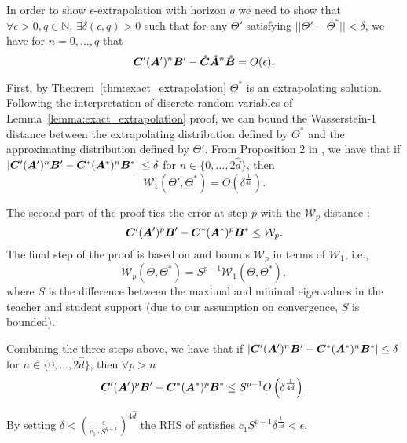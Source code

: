\begin{sproof}
In order to show $\epsilon$-extrapolation with horizon $q$ we need to show that $\forall\epsilon>0, q\in\mathbb{N}$, $\exists \delta(\epsilon,q)>0$ such that for any $\Theta'$ satisfying $||\Theta'-\Theta^*||<\delta$, we have for $n=0,\dots,q$ that
\begin{equation}
    {\bm{C}}'({\bm{A}}')^n{\bm{B}}'-\hat{{\bm{C}}}\hat{{\bm{A}}}^n\hat{{\bm{B}}}=O(\epsilon).
\end{equation}

First, by Theorem~\ref{thm:exact_extrapolation} $\Theta^*$ is an extrapolating solution. Following the interpretation of discrete random variables of Lemma~\ref{lemma:exact_extrapolation} proof, we can bound the Wasserstein-1 distance between the extrapolating distribution defined by $\Theta^*$ and the approximating distribution defined by $\Theta'$. From Proposition 2 in \cite{wu2020optimal}, we have that if $|{\bm{C}}'({\bm{A}}')^n{\bm{B}}'-{\bm{C}}^*({\bm{A}}^*)^n{\bm{B}}^*|\le \delta$ for $n\in\lbrace 0,\dots,2\hat{d}\rbrace$, then
\begin{equation}
    \mathcal{W}_1(\Theta',\Theta^*)=O\left(\delta^{\frac{1}{4\hat{d}}}\right).
\end{equation}

The second part of the proof ties the error at step $p$ with the $\mathcal{W}_p$ distance \citep{biswas2021bounding}:
\begin{equation}
    {\bm{C}}'({\bm{A}}')^p{\bm{B}}'-{\bm{C}}^*({\bm{A}}^*)^p{\bm{B}}^*\le \mathcal{W}_p.
\end{equation}
The final step of the proof is based on \cite{panaretos2019statistical} and bounds $\mathcal{W}_p$ in terms of $\mathcal{W}_1$, i.e.,
\begin{equation}
    \mathcal{W}_p(\Theta,\Theta^*)= S^{p-1}\mathcal{W}_1(\Theta,\Theta^*),
\end{equation}
where $S$ is the difference between the maximal and minimal eigenvalues in the teacher and student support (due to our assumption on convergence, $S$ is bounded).


Combining the three steps above, we have that if $|{\bm{C}}'({\bm{A}}')^n{\bm{B}}'-{\bm{C}}^*({\bm{A}}^*)^n{\bm{B}}^*|\le \delta$ for $n\in\lbrace 0,\dots,2\hat{d}\rbrace$, then $\forall p>n$ \begin{equation}\label{eq:final_inequality}
    {\bm{C}}'({\bm{A}}')^p{\bm{B}}'-{\bm{C}}^*({\bm{A}}^*)^p{\bm{B}}^*\le S^{p-1}O\left(\delta^{\frac{1}{4\hat{d}}}\right).
\end{equation}

By setting $\delta<\left(\frac{\epsilon}{c_1\cdot S^{q-1}}\right)^{4\hat{d}}$ the RHS of  satisfies $c_1S^{p-1}\delta^{\frac{1}{4\hat{d}}}<\epsilon$.
\end{sproof}

